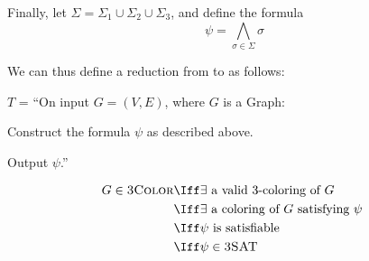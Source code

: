 \begin{Answer}
  Finally, let $\Sigma = \Sigma_1 \cup \Sigma_2 \cup \Sigma_3$,
  and define the formula
  \[
    \psi = \bigwedge_{\sigma \in \Sigma} \sigma
  \]

  \newpage
  We can thus define a reduction from \TColor to \TSAT as follows:

  \step
  $T$ = ``On input $G = (V, E)$, where $G$ is a Graph:
  \begin{enumarabic}
    \item Construct the formula $\psi$ as described above.
    \item Output $\psi$.''
  \end{enumarabic}

  \step
  \begin{align*}
    G \in \TColor &\Iff \exists \text{ a valid $3$-coloring of $G$ } \\
    &\Iff \exists \text{ a coloring of $G$ satisfying $\psi$ } \\
    &\Iff \psi \text{ is satisfiable } \\
    &\Iff \psi \in \TSAT
  \end{align*}


\end{Answer}
